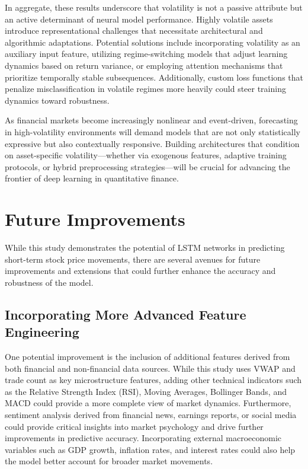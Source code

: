 \documentclass[letterpaper]{article}
\begin{document}
In aggregate, these results underscore that volatility is not a passive attribute but an active determinant of neural model performance. Highly volatile assets introduce representational challenges that necessitate architectural and algorithmic adaptations. Potential solutions include incorporating volatility as an auxiliary input feature, utilizing regime-switching models that adjust learning dynamics based on return variance, or employing attention mechanisms that prioritize temporally stable subsequences. Additionally, custom loss functions that penalize misclassification in volatile regimes more heavily could steer training dynamics toward robustness.

As financial markets become increasingly nonlinear and event-driven, forecasting in high-volatility environments will demand models that are not only statistically expressive but also contextually responsive. Building architectures that condition on asset-specific volatility—whether via exogenous features, adaptive training protocols, or hybrid preprocessing strategies—will be crucial for advancing the frontier of deep learning in quantitative finance.

\section{Future Improvements}

While this study demonstrates the potential of LSTM networks in predicting short-term stock price movements, there are several avenues for future improvements and extensions that could further enhance the accuracy and robustness of the model.

\subsection{Incorporating More Advanced Feature Engineering}
One potential improvement is the inclusion of additional features derived from both financial and non-financial data sources. While this study uses VWAP and trade count as key microstructure features, adding other technical indicators such as the Relative Strength Index (RSI), Moving Averages, Bollinger Bands, and MACD could provide a more complete view of market dynamics. Furthermore, sentiment analysis derived from financial news, earnings reports, or social media could provide critical insights into market psychology and drive further improvements in predictive accuracy. Incorporating external macroeconomic variables such as GDP growth, inflation rates, and interest rates could also help the model better account for broader market movements.
\end{document}
